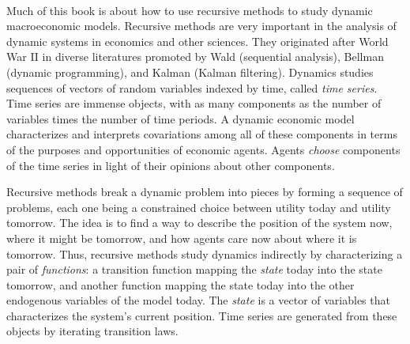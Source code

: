
\


{}
\noindent Much of this book is about how to use recursive methods to study dynamic
macro\-economic models. Recursive methods are very important in the
analysis of dynamic systems in economics and other sciences. They
originated after World War II in diverse literatures promoted by
Wald (sequential analysis), Bellman (dynamic programming), and
Kalman (Kalman filtering).   
\noindent Dynamics studies sequences  of vectors of random variables
indexed by time, called {\it time series}.     Time series
are immense objects, with as many components as the
number  of variables times the number of time periods.
A dynamic economic
model  characterizes and
interprets covariations  among    all of these components
in terms of the purposes and opportunities  of economic agents.
Agents {\it choose\/} components of the time series in light
of their opinions about other components.

Recursive methods   break a dynamic problem
into pieces by forming a sequence  of problems, each one
being a constrained choice between utility today and utility  tomorrow.
The idea is to find a way to describe the position
of the system now, where it might be tomorrow, and
how agents care now about where  it is tomorrow. Thus,
recursive methods study dynamics indirectly by characterizing a pair
of {\it functions}: a transition function mapping the {\it state} today into the state tomorrow,
 and another function mapping the state today into
the other endogenous variables of the model today.
The {\it state\/} is a vector of variables that characterizes
the system's current position.  Time series
are generated from these objects
by iterating  transition laws.


